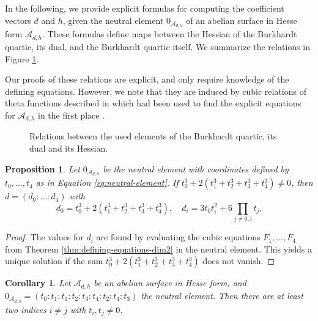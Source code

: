 \documentclass[11pt]{amsart}
\newtheorem{proposition}[theorem]{Proposition}
\newtheorem{corollary}[theorem]{Corollary}
\theoremstyle{definition}
\newcommand{\B}{\mathcal{B}}
\newcommand{\A}{\mathcal{A}}
\begin{document}
In the following, we provide explicit formulas for computing the coefficient vectors $d$ and $h$, given the neutral element $0_{\A_{d,h}}$ of an abelian surface in Hesse form $\A_{d,h}$. These formulas define maps between the Hessian of the Burkhardt quartic, its dual, and the Burkhardt quartic itself. We summarize the relations in Figure \ref{fig:relations-coefficients}. 

Our proofs of these relations are explicit, and only require knowledge of the defining equations. However, we note that they are induced by cubic relations of theta functions described in \cite{birkenhake1990cubic} which had been used to find the explicit equations for $\A_{d,h}$ in the first place \cite{gunji2006defining}. 

\begin{figure}
    \centering
{}
    \caption{Relations between the used elements of the Burkhardt quartic, its dual and its Hessian.}
    \label{fig:relations-coefficients}
\end{figure}



\begin{proposition} \label{prop:t-to-d}
	Let $0_{\A_{d,h}}$ be the neutral element with coordinates defined by $t_0, \dots, t_4$ as in Equation \ref{eq:neutral-element}. If $t_0^3 + 2(t_1^3 + t_2^3 + t_3^3 + t_4^3) \neq 0$, then $d = (d_0: \dots: d_4)$ with 
	\[
	d_0 = t_0^3 + 2(t_1^3 + t_2^3 + t_3^3 + t_4^3), \quad d_i = 3t_0t_i^2 + 6 \prod_{j\neq 0, i} t_j.
	\]
\end{proposition}

\begin{proof}
	The values for $d_i$ are found by evaluating the cubic equations $F_1, \dots, F_4$ from Theorem \ref{thm:defining-equations-dim2} in the neutral element. This yields a unique solution if the sum $t_0^3 + 2(t_1^3 + t_2^3 + t_3^3 + t_4^3)$ does not vanish. 
\end{proof}

\begin{corollary} \label{cor:non-zero-coordinates}
	Let $\A_{d,h}$ be an abelian surface in Hesse form, and  $0_{\A_{d,h}} = (t_0 : t_1 : t_1 : t_2 : t_3: t_4 : t_2 : t_4 : t_3)$ the neutral element. Then there are at least two indices $i \neq j$ with $t_i,t_j \neq 0$. 
\end{corollary}
\end{document}

